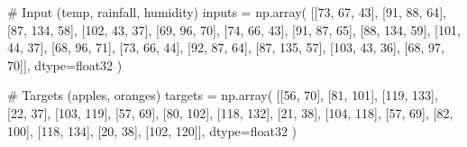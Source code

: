 \documentclass[
  letterpaper,
  DIV=11,
  numbers=noendperiod]{scrartcl}
\newenvironment{Shaded}{\begin{snugshade}}{\end{snugshade}}
\newcommand{\CommentTok}[1]{\textcolor[rgb]{0.37,0.37,0.37}{#1}}
\newcommand{\DecValTok}[1]{\textcolor[rgb]{0.68,0.00,0.00}{#1}}
\newcommand{\NormalTok}[1]{\textcolor[rgb]{0.00,0.23,0.31}{#1}}
\newcommand{\OperatorTok}[1]{\textcolor[rgb]{0.37,0.37,0.37}{#1}}
\newcommand{\StringTok}[1]{\textcolor[rgb]{0.13,0.47,0.30}{#1}}
\begin{document}
\begin{Shaded}
\begin{Highlighting}[]
\CommentTok{\# Input (temp, rainfall, humidity)}
\NormalTok{inputs }\OperatorTok{=}\NormalTok{ np.array(}
\NormalTok{    [[}\DecValTok{73}\NormalTok{, }\DecValTok{67}\NormalTok{, }\DecValTok{43}\NormalTok{],}
\NormalTok{    [}\DecValTok{91}\NormalTok{, }\DecValTok{88}\NormalTok{, }\DecValTok{64}\NormalTok{],}
\NormalTok{    [}\DecValTok{87}\NormalTok{, }\DecValTok{134}\NormalTok{, }\DecValTok{58}\NormalTok{],}
\NormalTok{    [}\DecValTok{102}\NormalTok{, }\DecValTok{43}\NormalTok{, }\DecValTok{37}\NormalTok{],}
\NormalTok{    [}\DecValTok{69}\NormalTok{, }\DecValTok{96}\NormalTok{, }\DecValTok{70}\NormalTok{],}
\NormalTok{    [}\DecValTok{74}\NormalTok{, }\DecValTok{66}\NormalTok{, }\DecValTok{43}\NormalTok{],}
\NormalTok{    [}\DecValTok{91}\NormalTok{, }\DecValTok{87}\NormalTok{, }\DecValTok{65}\NormalTok{],}
\NormalTok{    [}\DecValTok{88}\NormalTok{, }\DecValTok{134}\NormalTok{, }\DecValTok{59}\NormalTok{],}
\NormalTok{    [}\DecValTok{101}\NormalTok{, }\DecValTok{44}\NormalTok{, }\DecValTok{37}\NormalTok{],}
\NormalTok{    [}\DecValTok{68}\NormalTok{, }\DecValTok{96}\NormalTok{, }\DecValTok{71}\NormalTok{],}
\NormalTok{    [}\DecValTok{73}\NormalTok{, }\DecValTok{66}\NormalTok{, }\DecValTok{44}\NormalTok{],}
\NormalTok{    [}\DecValTok{92}\NormalTok{, }\DecValTok{87}\NormalTok{, }\DecValTok{64}\NormalTok{],}
\NormalTok{    [}\DecValTok{87}\NormalTok{, }\DecValTok{135}\NormalTok{, }\DecValTok{57}\NormalTok{],}
\NormalTok{    [}\DecValTok{103}\NormalTok{, }\DecValTok{43}\NormalTok{, }\DecValTok{36}\NormalTok{],}
\NormalTok{    [}\DecValTok{68}\NormalTok{, }\DecValTok{97}\NormalTok{, }\DecValTok{70}\NormalTok{]], }
\NormalTok{    dtype}\OperatorTok{=}\StringTok{\textquotesingle{}float32\textquotesingle{}}
\NormalTok{)}

\CommentTok{\# Targets (apples, oranges)}
\NormalTok{targets }\OperatorTok{=}\NormalTok{ np.array(}
\NormalTok{    [[}\DecValTok{56}\NormalTok{, }\DecValTok{70}\NormalTok{],}
\NormalTok{    [}\DecValTok{81}\NormalTok{, }\DecValTok{101}\NormalTok{],}
\NormalTok{    [}\DecValTok{119}\NormalTok{, }\DecValTok{133}\NormalTok{],}
\NormalTok{    [}\DecValTok{22}\NormalTok{, }\DecValTok{37}\NormalTok{],}
\NormalTok{    [}\DecValTok{103}\NormalTok{, }\DecValTok{119}\NormalTok{],}
\NormalTok{    [}\DecValTok{57}\NormalTok{, }\DecValTok{69}\NormalTok{],}
\NormalTok{    [}\DecValTok{80}\NormalTok{, }\DecValTok{102}\NormalTok{],}
\NormalTok{    [}\DecValTok{118}\NormalTok{, }\DecValTok{132}\NormalTok{],}
\NormalTok{    [}\DecValTok{21}\NormalTok{, }\DecValTok{38}\NormalTok{],}
\NormalTok{    [}\DecValTok{104}\NormalTok{, }\DecValTok{118}\NormalTok{],}
\NormalTok{    [}\DecValTok{57}\NormalTok{, }\DecValTok{69}\NormalTok{],}
\NormalTok{    [}\DecValTok{82}\NormalTok{, }\DecValTok{100}\NormalTok{],}
\NormalTok{    [}\DecValTok{118}\NormalTok{, }\DecValTok{134}\NormalTok{],}
\NormalTok{    [}\DecValTok{20}\NormalTok{, }\DecValTok{38}\NormalTok{],}
\NormalTok{    [}\DecValTok{102}\NormalTok{, }\DecValTok{120}\NormalTok{]],}
\NormalTok{    dtype}\OperatorTok{=}\StringTok{\textquotesingle{}float32\textquotesingle{}}
\NormalTok{)}


\end{Highlighting}
\end{Shaded}
\end{document}
